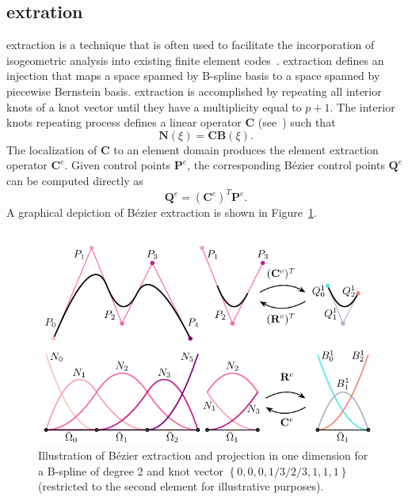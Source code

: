 \subsection{\Bezier extration}

\Bezier extraction is a technique that is often used to facilitate the incorporation of isogeometric analysis into existing finite element codes~\cite{borden2011isogeometric,scott2011isogeometric}. \Bezier extraction defines an injection that maps a space spanned by B-spline basis to a space spanned by piecewise Bernstein basis. \Bezier extraction is accomplished by repeating all interior knots of a knot vector until they have a multiplicity equal to $p+1$. The interior knots repeating process defines a linear operator $\mathbf{C}$ (see~\cite{borden2011isogeometric}) such that
\begin{equation}
    \mathbf{N}(\xi)=\mathbf{C}\mathbf{B}(\xi).
\end{equation}
The localization of $\mathbf{C}$ to an element domain produces the element extraction operator $\mathbf{C}^e$.
Given control points $\mathbf{P}^e$, the corresponding B\'ezier control points $\mathbf{Q}^e$ can be computed directly as
\begin{equation}
    \mathbf{Q}^e=(\mathbf{C}^e)^T\mathbf{P}^e.
\end{equation}
A graphical depiction of B\'{e}zier extraction is shown in Figure~\ref{fig:extraction_and_projection}.

\begin{figure}
    \centering
    \includegraphics[width=.8\linewidth]{elements_global.pdf}
    \caption{Illustration of B\'ezier extraction and projection in one dimension for a B-spline of degree 2 and knot vector $\left\{0,0,0,1/3/2/3,1,1,1\right\}$ (restricted to the second element for illustrative purposes).}
    \label{fig:extraction_and_projection}
\end{figure}

